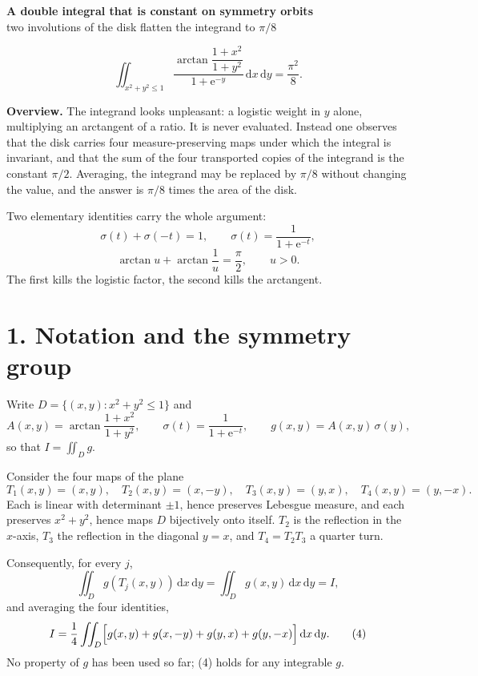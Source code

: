 \documentclass[12pt]{article}
\newcommand{\dd}{\,\mathrm{d}}
\newcommand{\e}{\mathrm{e}}
\newcommand{\D}{D}
\begin{document}
\begin{center}
{\Large\bfseries A double integral that is constant on symmetry orbits}\\[0.35em]
{\large two involutions of the disk flatten the integrand to \(\pi/8\)}
\end{center}

\[
\boxed{\displaystyle
\iint_{x^2+y^2\le1}
\frac{\arctan\dfrac{1+x^2}{1+y^2}}{1+\e^{-y}}
\dd x\dd y
=\frac{\pi^2}{8}.}
\]

\textbf{Overview.}
The integrand looks unpleasant: a logistic weight in \(y\) alone,
multiplying an arctangent of a ratio. It is never evaluated. Instead one
observes that the disk carries four measure-preserving maps under which
the integral is invariant, and that the sum of the four transported
copies of the integrand is the constant \(\pi/2\). Averaging, the
integrand may be replaced by \(\pi/8\) without changing the value, and
the answer is \(\pi/8\) times the area of the disk.

Two elementary identities carry the whole argument:
\[
\sigma(t)+\sigma(-t)=1,\qquad \sigma(t)=\frac1{1+\e^{-t}},
\tag{1}
\]
\[
\arctan u+\arctan\frac1u=\frac\pi2,\qquad u>0.
\tag{2}
\]
The first kills the logistic factor, the second kills the arctangent.

\section*{1. Notation and the symmetry group}

Write \(\D=\{(x,y):x^2+y^2\le1\}\) and
\[
A(x,y)=\arctan\frac{1+x^2}{1+y^2},
\qquad
\sigma(t)=\frac1{1+\e^{-t}},
\qquad
g(x,y)=A(x,y)\,\sigma(y),
\]
so that \(I=\iint_\D g\).

Consider the four maps of the plane
\[
T_1(x,y)=(x,y),\quad
T_2(x,y)=(x,-y),\quad
T_3(x,y)=(y,x),\quad
T_4(x,y)=(y,-x).
\tag{3}
\]
Each is linear with determinant \(\pm1\), hence preserves Lebesgue
measure, and each preserves \(x^2+y^2\), hence maps \(\D\) bijectively
onto itself. \(T_2\) is the reflection in the \(x\)-axis, \(T_3\) the
reflection in the diagonal \(y=x\), and \(T_4=T_2T_3\) a quarter turn.

Consequently, for every \(j\),
\[
\iint_\D g(T_j(x,y))\dd x\dd y=\iint_\D g(x,y)\dd x\dd y=I,
\]
and averaging the four identities,
\[
I=\frac14\iint_\D
\Bigl[g(x,y)+g(x,-y)+g(y,x)+g(y,-x)\Bigr]\dd x\dd y.
\tag{4}
\]
No property of \(g\) has been used so far; (4) holds for any integrable
\(g\).
\end{document}
